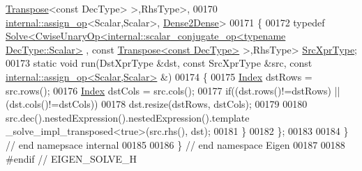 \begin{DoxyCode}
      \hyperlink{group___core___module_class_eigen_1_1_transpose}{Transpose}<const DecType> >,RhsType>,
00170                   \hyperlink{struct_eigen_1_1internal_1_1assign__op}{internal::assign\_op}<Scalar,Scalar>, 
      \hyperlink{struct_eigen_1_1internal_1_1_dense2_dense}{Dense2Dense}>
00171 \{
00172   \textcolor{keyword}{typedef} 
      \hyperlink{group___core___module_class_eigen_1_1_solve}{Solve<CwiseUnaryOp<internal::scalar\_conjugate\_op<typename DecType::Scalar>}
      , \textcolor{keyword}{const} \hyperlink{group___core___module_class_eigen_1_1_transpose}{Transpose<const DecType>} >,RhsType> \hyperlink{group___core___module_class_eigen_1_1_solve}{SrcXprType};
00173   \textcolor{keyword}{static} \textcolor{keywordtype}{void} run(DstXprType &dst, \textcolor{keyword}{const} SrcXprType &src, \textcolor{keyword}{const} 
      \hyperlink{struct_eigen_1_1internal_1_1assign__op}{internal::assign\_op<Scalar,Scalar>} &)
00174   \{
00175     \hyperlink{namespace_eigen_a62e77e0933482dafde8fe197d9a2cfde}{Index} dstRows = src.rows();
00176     \hyperlink{namespace_eigen_a62e77e0933482dafde8fe197d9a2cfde}{Index} dstCols = src.cols();
00177     \textcolor{keywordflow}{if}((dst.rows()!=dstRows) || (dst.cols()!=dstCols))
00178       dst.resize(dstRows, dstCols);
00179     
00180     src.dec().nestedExpression().nestedExpression().template \_solve\_impl\_transposed<true>(src.rhs(), dst);
00181   \}
00182 \};
00183 
00184 \} \textcolor{comment}{// end namepsace internal}
00185 
00186 \} \textcolor{comment}{// end namespace Eigen}
00187 
00188 \textcolor{preprocessor}{#endif // EIGEN\_SOLVE\_H}
\end{DoxyCode}
